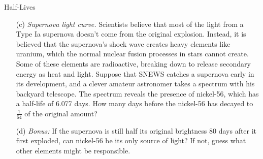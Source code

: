 \documentclass[12pt]{article}
\begin{document}
\begin{probdesc}{5}{Half-Lives}
\begin{enumerate}
\item[(c)] {\em Supernova light curve.}  Scientists believe that most
  of the light from a Type Ia supernova doesn't come from the original
  explosion.  Instead, it is believed that the supernova's shock wave
  creates heavy elements like uranium, which the normal nuclear fusion
  processes in stars cannot create.  Some of these elements are
  radioactive, breaking down to release secondary energy as heat and
  light.  Suppose that SNEWS catches a supernova early in its
  development, and a clever amateur astronomer takes a spectrum with
  his backyard telescope.  The spectrum reveals the presence of
  nickel-56, which has a half-life of 6.077 days.  How many days
  before the nickel-56 has decayed to $\frac{1}{64}$ of the original
  amount?

\item[(d)] {\em Bonus:} If the supernova is still half its original
  brightness 80 days after it first exploded, can nickel-56 be its
  only source of light?  If not, guess what other elements might be
  responsible.
\end{enumerate}
\end{probdesc}
\end{document}
